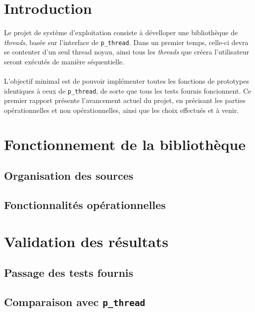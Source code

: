 \documentclass[a4paper]{article}
\begin{document}


\newpage


\section*{Introduction}

\paragraph{}
Le projet de système d'exploitation consiste à dévelloper une bibliothèque de \emph{threads}, basée sur l'interface de \texttt{p\_thread}. Dans un premier temps, celle-ci devra se contenter d'un seul thread noyau, ainsi tous les \emph{threads} que créera l'utilisateur seront exécutés de manière séquentielle. 

\paragraph{}
L'objectif minimal est de pouvoir implémenter toutes les fonctions de prototypes identiques à ceux de \texttt{p\_thread}, de sorte que tous les tests fournis foncionnent. Ce premier rapport présente l'avancement actuel du projet, en précisant les parties opérationnelles et non opérationnelles, ainsi que les choix effectués et à venir.

\section{Fonctionnement de la bibliothèque}

\subsection{Organisation des sources}

\subsection{Fonctionnalités opérationnelles}

\section{Validation des résultats}

\subsection{Passage des tests fournis}

\subsection{Comparaison avec \texttt{p\_thread}}
\end{document}
